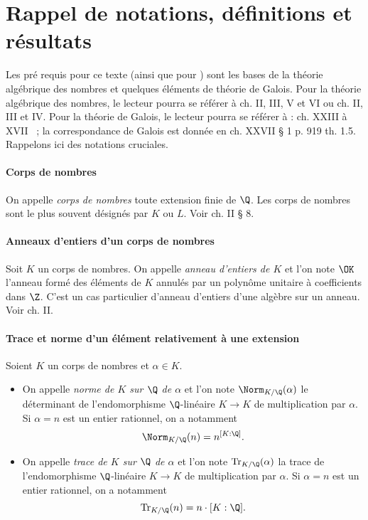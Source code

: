 \section*{Rappel de notations, définitions et résultats}

Les pré requis pour ce texte (ainsi que pour \cite{article}) sont les bases de la théorie algébrique des nombres et quelques éléments de théorie de Galois. Pour la théorie algébrique des nombres, le lecteur pourra se référer à \cite{Samuel} ch. II, III, V et VI ou \cite{Kraus} ch. II, III et IV. Pour la théorie de Galois, le lecteur pourra se référer à \cite{GrandCombat} : ch. XXIII à XVII ~; la correspondance de Galois est donnée en ch. XXVII § 1 p. 919 th. 1.5. Rappelons ici des notations cruciales.

\paragraph{Corps de nombres} On appelle \emph{corps de nombres} toute extension finie de $\Q$. Les corps de nombres sont le plus souvent désignés par $K$ ou $L$. Voir \cite{Samuel} ch. II § 8.

\paragraph{Anneaux d'entiers d'un corps de nombres} Soit $K$ un corps de nombres. On appelle \emph{anneau d'entiers de $K$} et l'on note $\OK$ l'anneau formé des éléments de $K$ annulés par un polynôme unitaire à coefficients dans $\Z$. C'est un cas particulier d'anneau d'entiers d'une algèbre sur un anneau. Voir \cite{Samuel} ch. II.

\paragraph{Trace et norme d'un élément relativement à une extension} Soient $K$ un corps de nombres et $\alpha\in K$.
	\begin{itemize}
		\item On appelle \emph{norme de $K$ sur $\Q$ de $\alpha$} et l'on note $\Norm_{K/\Q}(\alpha)$ le déterminant de l'endomorphisme $\Q$-linéaire $K\to K$ de multiplication par $\alpha$. Si $\alpha=n$ est un entier rationnel, on a notamment \[\Norm_{K/\Q}(n) = n^{[K : \Q]}.\]
		\item On appelle \emph{trace de $K$ sur $\Q$ de $\alpha$} et l'on note $\mathrm{Tr}_{K/\Q}(\alpha)$ la trace de l'endomorphisme $\Q$-linéaire $K\to K$ de multiplication par $\alpha$. Si $\alpha= n$ est un entier rationnel, on a notamment \[\mathrm{Tr}_{K/\Q}(n) = n\cdot{[K : \Q]}.\]
	\end{itemize}

